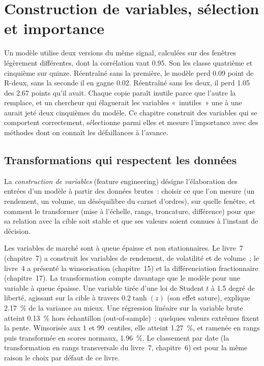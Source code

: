 \chapter{Construction de variables, sélection et importance}\label{ch:ml:feature-engineering-selection-and-importance}

Un modèle utilise deux versions du même signal, calculées sur des fenêtres légèrement différentes, dont la corrélation vaut 0.95. Son
 les classe quatrième et cinquième sur quinze. Réentraîné sans la première, le modèle perd 0.09 point de R-deux,
sans la seconde il en gagne 0.02. Réentraîné sans les deux, il perd 1.05 des 2.67 points qu'il avait. Chaque copie paraît
inutile parce que l'autre la remplace, et un chercheur qui élaguerait les variables «~inutiles~» une à une aurait jeté
deux cinquièmes du modèle. Ce chapitre construit des variables qui se comportent correctement, sélectionne parmi elles et mesure
l'importance avec des méthodes dont on connaît les défaillances à l'avance.

\section{Transformations qui respectent les données}

\begin{definition}\label{def:ml:feature-engineering-selection-and-importance:engineering}
La \emph{construction de variables} (feature engineering) désigne l'élaboration des entrées d'un modèle à partir des données brutes~: choisir ce que l'on mesure
(un rendement, un volume, un déséquilibre du carnet d'ordres), sur quelle fenêtre, et comment le transformer (mise à l'échelle, rangs, troncature, différence)
pour que sa relation avec la cible soit stable et que ses valeurs soient connues à l'instant de décision.
\end{definition}

Les variables de marché sont à queue épaisse et non stationnaires. Le livre~7 (chapitre~7) a construit les variables de rendement, de volatilité
et de volume~; le livre~4 a présenté la winsorisation (chapitre~15) et la différenciation fractionnaire (chapitre~17). La transformation compte
davantage que le modèle pour une variable à queue épaisse. Une variable tirée d'une loi de Student $t$ à 1.5 degré de liberté,
agissant sur la cible à travers $0.2\tanh(z)$ (son effet sature), explique 2.17~\% de la variance au mieux. Une régression
linéaire sur la variable brute atteint 0.13~\% hors échantillon (out-of-sample)~: quelques valeurs extrêmes fixent la pente. Winsorisée aux 1
et 99~centiles, elle atteint 1.27~\%, et ramenée en rangs puis transformée en scores normaux, 1.96~\%. Le classement par date (la
transformation en rangs transversale du livre~7, chapitre~6) est pour la même raison le choix par défaut de ce livre.

